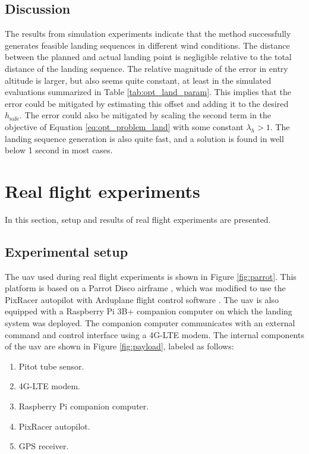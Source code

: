 \subsection{Discussion}
The results from simulation experiments indicate that the method successfully generates feasible landing 
sequences in different wind conditions. The distance between the planned and actual landing point is negligible relative to the total distance of the landing sequence.
The relative magnitude of the error in entry altitude is larger, but also seems quite constant, at least in the simulated evaluations summarized in Table \ref{tab:opt_land_param}. 
This implies that the error could be mitigated by estimating this offset and adding it to the desired $h_{\text{safe}}$. The error could also be mitigated by scaling the second term in the objective of 
Equation \eqref{eq:opt_problem_land} with some constant $\lambda_h>1$. The landing sequence generation is also quite fast, and a solution is found in well below 1 second in most cases.


\section{Real flight experiments}
In this section, setup and results of real flight experiments are presented.
\subsection{Experimental setup}
The \ac{uav} used during real flight experiments is shown in Figure \ref{fig:parrot}. This platform is based on a Parrot Disco airframe \cite{parrot}, 
which was modified to use the PixRacer autopilot \cite{pixracer} with Arduplane flight control software \cite{arduplane}. The \ac{uav} is also equipped with a 
Raspberry Pi 3B+ companion computer on which the landing system was deployed. The companion computer communicates with an external command and control interface using 
a 4G-LTE modem. The internal components of the \ac{uav} are shown in Figure \ref{fig:payload}, labeled as follows:
\begin{enumerate}
    \item Pitot tube sensor.
    \item 4G-LTE modem.
    \item Raspberry Pi companion computer.
    \item PixRacer autopilot.
    \item GPS receiver.
\end{enumerate}

